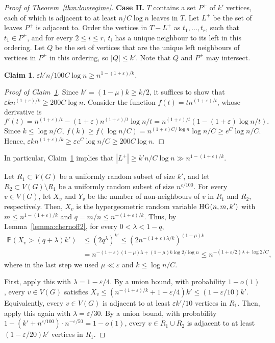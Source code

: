 \documentclass{article}
\theoremstyle{plain}
\newtheorem{claim}[theorem]{Claim}
\theoremstyle{definition}
\numberwithin{equation}{section}
\def\eps{\varepsilon}
\begin{document}
\begin{proof}[Proof of Theorem~\ref{thm:lowregime}]
\noindent\textbf{Case II.} $T$ contains a set $P^+$ of $k'$ vertices, each of which is adjacent to at least $n/C\log n$ leaves in $T$. Let $L^+$ be the set of leaves $P^+$ is adjacent to. Order the vertices in $T-L^+$ as $t_1,\ldots,t_r$, such that $t_1\in P^+$, and for every $2\leq i\leq r$, $t_i$ has a unique neighbour to its left in this ordering. Let $Q$ be the set of vertices that are the unique left neighbours of vertices in $P^+$ in this ordering, so $|Q|\leq k'$. Note that $Q$ and $P^+$ may intersect. 
\begin{claim}\label{claim:ineq}
$\eps k'n/100C\log n\geq n^{1-(1+\eps)/k}$.
\end{claim}
\begin{proof}[Proof of Claim~\ref{claim:ineq}]
Since $k'=(1-\mu)k\geq k/2$, it suffices to show that $\eps kn^{(1+\eps)/k}\geq 200C\log n$. Consider the function $f(t)=tn^{(1+\eps)/t}$, whose derivative is 
\[f'(t)=n^{(1+\eps)/t}-(1+\eps)n^{(1+\eps)/t}\log n/t=n^{(1+\eps)/t}(1-(1+\eps)\log n/t).\]
Since $k\leq\log n/C$, $f(k)\geq f(\log n/C)=n^{(1+\eps)C/\log n}\log n/C\geq e^{C}\log n/C$. Hence, $\eps kn^{(1+\eps)/k}\geq\eps e^C\log n/C\geq 200C\log n$.
\renewcommand{\qedsymbol}{$\boxdot$}
\end{proof}
\renewcommand{\qedsymbol}{$\square$}

In particular, Claim~\ref{claim:ineq} implies that $|L^+|\geq k'n/C\log n\gg n^{1-(1+\eps)/k}$.

Let $R_1\subset V(G)$ be a uniformly random subset of size $k'$, and let $R_2\subset V(G)\setminus R_1$ be a uniformly random subset of size $n^{\eps/100}$. For every $v\in V(G)$, let $X_v$ and $Y_v$ be the number of non-neighbours of $v$ in $R_1$ and $R_2$, respectively. Then, $X_v$ is the hypergeometric random variable $\textup{HG}(n,m,k')$ with $m\leq n^{1-(1+\eps)/k}$ and $q=m/n\leq n^{-(1+\eps)/k}$. Thus, by Lemma~\ref{lemma:chernoff2}, for every $0<\lambda<1-q$,
\begin{align*}
\mathbb{P}(X_v>(q+\lambda)k')&\leq(2q^\lambda)^{k'}\leq(2n^{-(1+\eps)\lambda/k})^{(1-\mu)k}\\
&=n^{-(1+\eps)(1-\mu)\lambda+(1-\mu)k\log 2/\log n}\leq n^{-(1+\eps/2)\lambda+\log 2/C},
\end{align*}
where in the last step we used $\mu\ll\eps$ and $k\leq\log n/C$.

First, apply this with $\lambda=1-\eps/4$. By a union bound, with probability $1-o(1)$, every $v\in V(G)$ satisfies $X_v\leq(n^{-(1+\eps)/k}+1-\eps/4)k'\leq(1-\eps/10)k'$. Equivalently, every $v\in V(G)$ is adjacent to at least $\eps k'/10$ vertices in $R_1$. Then, apply this again with $\lambda=\eps/30$. By a union bound, with probability $1-(k'+n^{\eps/100})\cdot n^{-\eps/50}=1-o(1)$, every $v\in R_1\cup R_2$ is adjacent to at least $(1-\eps/20)k'$ vertices in $R_1$. 


\end{proof}
\end{document}
